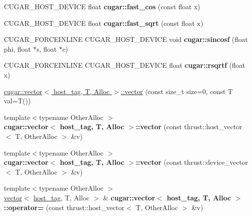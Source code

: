 \begin{DoxyCompactItemize}
\mbox{\label{group___basic_ga5fff0f0281d06eb52a2ad69fc5cd31ee}} 
C\+U\+G\+A\+R\+\_\+\+H\+O\+S\+T\+\_\+\+D\+E\+V\+I\+CE float {\bfseries cugar\+::fast\+\_\+cos} (const float x)
\item 
\mbox{\label{group___basic_ga5d3c47bc5d8a29efaf94b7586ce883c6}} 
C\+U\+G\+A\+R\+\_\+\+H\+O\+S\+T\+\_\+\+D\+E\+V\+I\+CE float {\bfseries cugar\+::fast\+\_\+sqrt} (const float x)
\item 
\mbox{\label{group___basic_ga49effe8ff35218dcdcb22dd448fc2dd5}} 
C\+U\+G\+A\+R\+\_\+\+F\+O\+R\+C\+E\+I\+N\+L\+I\+NE C\+U\+G\+A\+R\+\_\+\+H\+O\+S\+T\+\_\+\+D\+E\+V\+I\+CE void {\bfseries cugar\+::sincosf} (float phi, float $\ast$s, float $\ast$c)
\item 
\mbox{\label{group___basic_ga5e930e77aed0555b9135e7776d3956fc}} 
C\+U\+G\+A\+R\+\_\+\+F\+O\+R\+C\+E\+I\+N\+L\+I\+NE C\+U\+G\+A\+R\+\_\+\+H\+O\+S\+T\+\_\+\+D\+E\+V\+I\+CE float {\bfseries cugar\+::rsqrtf} (float x)
\item 
\hyperlink{group___basic_ga8407403c92ae9effc1472b1bf47bd3f6}{cugar\+::vector$<$ host\+\_\+tag, T, Alloc $>$\+::vector} (const size\+\_\+t size=0, const T val=T())
\item 
\mbox{\label{group___basic_ga22b0cf5965b8f325001b8488538d98c3}} 
{\footnotesize template$<$typename Other\+Alloc $>$ }\\{\bfseries cugar\+::vector$<$ host\+\_\+tag, T, Alloc $>$\+::vector} (const thrust\+::host\+\_\+vector$<$ T, Other\+Alloc $>$ \&v)
\item 
\mbox{\label{group___basic_gaa302406ec085b0374653c8d400be957b}} 
{\footnotesize template$<$typename Other\+Alloc $>$ }\\{\bfseries cugar\+::vector$<$ host\+\_\+tag, T, Alloc $>$\+::vector} (const thrust\+::device\+\_\+vector$<$ T, Other\+Alloc $>$ \&v)
\item 
\mbox{\label{group___basic_gae2e7ccf395b25ae638ee9a939ad2e160}} 
{\footnotesize template$<$typename Other\+Alloc $>$ }\\\hyperlink{structcugar_1_1vector}{vector}$<$ \hyperlink{structcugar_1_1host__tag}{host\+\_\+tag}, T, Alloc $>$ \& {\bfseries cugar\+::vector$<$ host\+\_\+tag, T, Alloc $>$\+::operator=} (const thrust\+::host\+\_\+vector$<$ T, Other\+Alloc $>$ \&v)

\end{DoxyCompactItemize}
